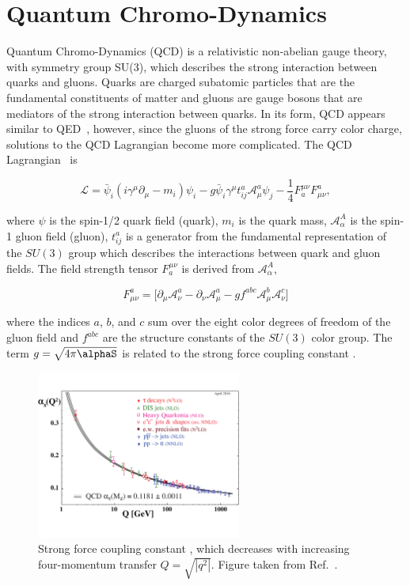 \section{Quantum Chromo-Dynamics}

Quantum Chromo-Dynamics (QCD) is a relativistic non-abelian gauge theory, with symmetry group SU(3), which describes the strong interaction between quarks and gluons. Quarks are charged subatomic particles that are the fundamental constituents of matter and gluons are gauge bosons that are mediators of the strong interaction between quarks. In its form, QCD appears similar to QED~\cite{Seymour:2005hs}, however, since the gluons of the strong force carry color charge, solutions to the QCD Lagrangian become more complicated. The QCD Lagrangian~\cite{qcdbook} is 

\begin{equation}
\mathcal{L}=\bar{\psi}_{i}(i\gamma^{\mu}\partial_{\mu}-m_{i})\psi_{i}-g\bar{\psi}_{i}\gamma^{\mu}t_{ij}^{a}\mathcal{A}_{\mu}^{a}\psi_{j}-\frac{1}{4}F^{\mu\nu}_{a}F_{\mu\nu}^{a},
\label{eq:lagrangian}
\end{equation}

where $\psi$ is the spin-1/2 quark field (quark), $m_{i}$ is the quark mass,  $\mathcal{A}_{\alpha}^{A}$ is the spin-1 gluon field (gluon), $t_{ij}^{a}$ is a generator from the fundamental representation of the $SU(3)$ group which describes the interactions between quark and gluon fields. The field strength tensor $F^{\mu\nu}_{a}$ is derived from $\mathcal{A}_{\alpha}^{A}$,

\begin{equation}
F_{\mu\nu}^{a}=\Big[ \partial_{\mu}\mathcal{A}_{\nu}^{a} - \partial_{\nu}\mathcal{A}_{\mu}^{a} - g f^{abc}\mathcal{A}_{\mu}^{b}\mathcal{A}_{\nu}^{c}\Big]
\label{eq:fieldtensor}
\end{equation}

where the indices $a$, $b$, and $c$ sum over the eight color degrees of freedom of the gluon field and $f^{abc}$ are the structure constants of the $SU(3)$ color group. The term $g=\sqrt{4 \pi \alphaS }$ is related to the strong force coupling constant \alphaS.

\begin{figure}
	\centerline{
		\includegraphics[width=0.6\textwidth]{figures/asq-2015.pdf} 
	}
	\caption{Strong force coupling constant \alphaqs, which decreases with increasing four-momentum transfer $Q=\sqrt{|q^{2}|}$.  Figure taken from Ref.~\cite{pdg:2018}.}
	\label{fig:strongforceconstant}
\end{figure}


